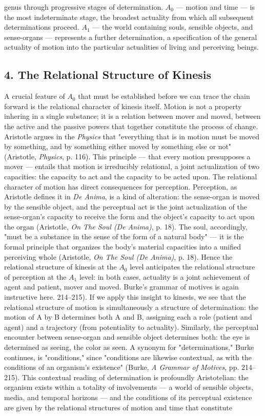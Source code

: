 genus through progressive stages of determination. $A_0$ --- motion and time --- is the most indeterminate stage, the broadest actuality from which all subsequent determinations proceed. $A_1$ --- the world containing souls, sensible objects, and sense-organs --- represents a further determination, a specification of the general actuality of motion into the particular actualities of living and perceiving beings. 

\subsection*{4. The Relational Structure of Kinesis}

A crucial feature of $A_0$ that must be established before we can trace the chain forward is the relational character of kinesis itself. Motion is not a property inhering in a single substance; it is a relation between mover and moved, between the active and the passive powers that together constitute the process of change. Aristotle argues in the \textit{Physics} that "everything that is in motion must be moved by something, and by something either moved by something else or not" (Aristotle, \textit{Physics}, p. 116). This principle --- that every motion presupposes a mover --- entails that motion is irreducibly relational, a joint actualization of two capacities: the capacity to act and the capacity to be acted upon. The relational character of motion has direct consequences for perception. Perception, as Aristotle defines it in \textit{De Anima}, is a kind of alteration: the sense-organ is moved by the sensible object, and the perceptual act is the joint actualization of the sense-organ's capacity to receive the form and the object's capacity to act upon the organ (Aristotle, \textit{On The Soul (De Anima)}, p. 18). The soul, accordingly, "must be a substance in the sense of the form of a natural body" --- it is the formal principle that organizes the body's material capacities into a unified perceiving whole (Aristotle, \textit{On The Soul (De Anima)}, p. 18). Hence the relational structure of kinesis at the $A_0$ level anticipates the relational structure of perception at the $A_1$ level: in both cases, actuality is a joint achievement of agent and patient, mover and moved. Burke's grammar of motives is again instructive here. 214--215). If we apply this insight to kinesis, we see that the relational structure of motion is simultaneously a structure of determination: the motion of A by B determines both A and B, assigning each a role (patient and agent) and a trajectory (from potentiality to actuality). Similarly, the perceptual encounter between sense-organ and sensible object determines both: the eye is determined as seeing, the color as seen. A synonym for "determinations," Burke continues, is "conditions," since "conditions are likewise contextual, as with the conditions of an organism's existence" (Burke, \textit{A Grammar of Motives}, pp. 214--215). This contextual reading of determination is profoundly Aristotelian: the organism exists within a totality of involvements --- a world of sensible objects, media, and temporal horizons --- and the conditions of its perceptual existence are given by the relational structures of motion and time that constitute 